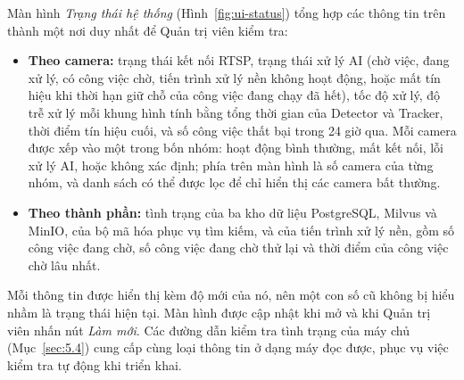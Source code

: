 Màn hình \emph{Trạng thái hệ thống} (Hình~\ref{fig:ui-status}) tổng hợp các thông tin trên thành một nơi duy nhất để Quản trị viên kiểm tra:
\begin{itemize}
    \item \textbf{Theo camera:} trạng thái kết nối RTSP, trạng thái xử lý AI (chờ việc, đang xử lý, có công việc chờ, tiến trình xử lý nền không hoạt động, hoặc mất tín hiệu khi thời hạn giữ chỗ của công việc đang chạy đã hết), tốc độ xử lý, độ trễ xử lý mỗi khung hình tính bằng tổng thời gian của Detector và Tracker, thời điểm tín hiệu cuối, và số công việc thất bại trong 24 giờ qua. Mỗi camera được xếp vào một trong bốn nhóm: hoạt động bình thường, mất kết nối, lỗi xử lý AI, hoặc không xác định; phía trên màn hình là số camera của từng nhóm, và danh sách có thể được lọc để chỉ hiển thị các camera bất thường.
    \item \textbf{Theo thành phần:} tình trạng của ba kho dữ liệu PostgreSQL, Milvus và MinIO, của bộ mã hóa phục vụ tìm kiếm, và của tiến trình xử lý nền, gồm số công việc đang chờ, số công việc đang chờ thử lại và thời điểm của công việc chờ lâu nhất.
\end{itemize}
Mỗi thông tin được hiển thị kèm độ mới của nó, nên một con số cũ không bị hiểu nhầm là trạng thái hiện tại. Màn hình được cập nhật khi mở và khi Quản trị viên nhấn nút \emph{Làm mới}. Các đường dẫn kiểm tra tình trạng của máy chủ (Mục~\ref{sec:5.4}) cung cấp cùng loại thông tin ở dạng máy đọc được, phục vụ việc kiểm tra tự động khi triển khai.
